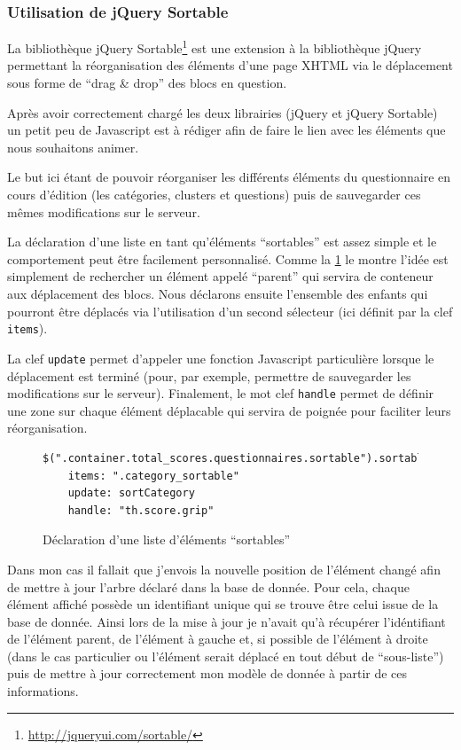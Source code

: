 \documentclass[12pt,a4paper]{book}
\begin{document}
\subsubsection{Utilisation de jQuery Sortable}

La bibliothèque jQuery Sortable\footnote{\url{http://jqueryui.com/sortable/}} est une extension à la bibliothèque jQuery permettant la réorganisation des éléments d'une page XHTML via le déplacement sous forme de ``drag \& drop'' des blocs en question.

Après avoir correctement chargé les deux librairies (jQuery et jQuery Sortable) un petit peu de Javascript est à rédiger afin de faire le lien avec les éléments que nous souhaitons animer.

Le but ici étant de pouvoir réorganiser les différents éléments du questionnaire en cours d'édition (les catégories, clusters et questions) puis de sauvegarder ces mêmes modifications sur le serveur.

La déclaration d'une liste en tant qu'éléments ``sortables'' est assez simple et le comportement peut être facilement personnalisé. Comme la \cref{fig.sort1} le montre l'idée est simplement de rechercher un élément appelé ``parent'' qui servira de conteneur aux déplacement des blocs. Nous déclarons ensuite l'ensemble des enfants qui pourront être déplacés via l'utilisation d'un second sélecteur (ici définit par la clef \texttt{items}).

La clef \texttt{update} permet d'appeler une fonction Javascript particulière lorsque le déplacement est terminé (pour, par exemple, permettre de sauvegarder les modifications sur le serveur). Finalement, le mot clef \texttt{handle} permet de définir une zone sur chaque élément déplacable qui servira de poignée pour faciliter leurs réorganisation.

\begin{figure}[h]
\begin{lstlisting}
$(".container.total_scores.questionnaires.sortable").sortable
    items: ".category_sortable"
    update: sortCategory
    handle: "th.score.grip"
\end{lstlisting}
 \caption{Déclaration d'une liste d'éléments ``sortables''}
 \label{fig.sort1}
\end{figure}

Dans mon cas il fallait que j'envois la nouvelle position de l'élément changé afin de mettre à jour l'arbre déclaré dans la base de donnée. Pour cela, chaque élément affiché possède un identifiant unique qui se trouve être celui issue de la base de donnée. Ainsi lors de la mise à jour je n'avait qu'à récupérer l'idéntifiant de l'élément parent, de l'élément à gauche et, si possible de l'élément à droite (dans le cas particulier ou l'élément serait déplacé en tout début de ``sous-liste'') puis de mettre à jour correctement mon modèle de donnée à partir de ces informations.
\end{document}
